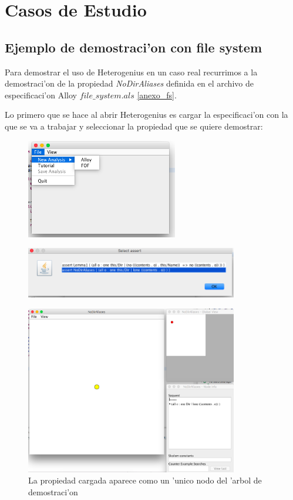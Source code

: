 \chapter{Casos de Estudio}

\section{Ejemplo de demostraci'on con file system}

Para demostrar el uso de Heterogenius en un caso real recurrimos a la demostraci'on de la propiedad \textit{NoDirAliases} definida en el archivo de especificaci'on Alloy \textit{$file\_system.als$} \ref{anexo_fs}.

Lo primero que se hace al abrir Heterogenius es cargar la especificaci'on con la que se va a trabajar y seleccionar la propiedad que se quiere demostrar:

\begin{figure}[H]
	\includegraphics[width=250px]{img/ejemplo/1.png}
	\centering
	\caption{}
\end{figure}

\begin{figure}[H]
	\includegraphics[width=350px]{img/ejemplo/2.png}
	\centering
	\caption{}
\end{figure}

\begin{figure}[H]
	\includegraphics[width=350px]{img/ejemplo/3.png}
	\centering
	\caption{La propiedad cargada aparece como un 'unico nodo del 'arbol de demostraci'on}
\end{figure}


